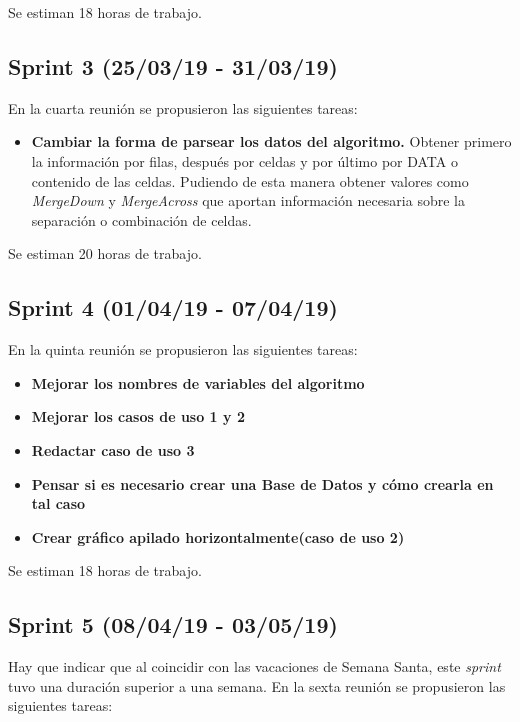 Se estiman 18 horas de trabajo.

\subsection{Sprint 3 (25/03/19 - 31/03/19)}
En la cuarta reunión se propusieron las siguientes tareas:

\begin{itemize}
\item
\textbf{Cambiar la forma de parsear los datos del algoritmo.} Obtener primero la información por filas, después por celdas y por último por DATA o contenido de las celdas. Pudiendo de esta manera obtener valores como \emph{MergeDown} y \emph{MergeAcross} que aportan información necesaria sobre la separación o combinación de celdas.   
\end{itemize}

Se estiman 20 horas de trabajo.

\subsection{Sprint 4 (01/04/19 - 07/04/19)}
En la quinta reunión se propusieron las siguientes tareas:

\begin{itemize}
\item
\textbf{Mejorar los nombres de variables del algoritmo}
\item
\textbf{Mejorar los casos de uso 1 y 2}
\item
\textbf{Redactar caso de uso 3}
\item
\textbf{Pensar si es necesario crear una Base de Datos y cómo crearla en tal caso}
\item
\textbf{Crear gráfico apilado horizontalmente(caso de uso 2)}
\end{itemize}

Se estiman 18 horas de trabajo.

\subsection{Sprint 5 (08/04/19 - 03/05/19)}
Hay que indicar que al coincidir con las vacaciones de Semana Santa, este \emph{sprint} tuvo una duración superior a una semana. En la sexta reunión se propusieron las siguientes tareas:

